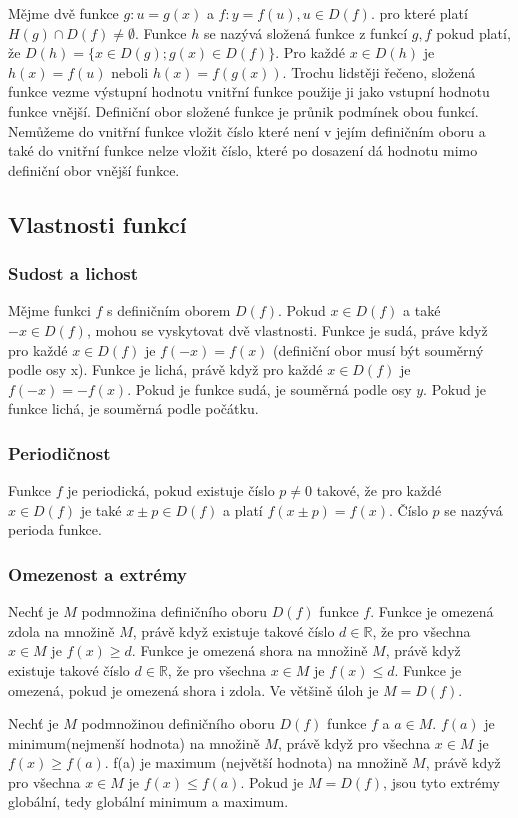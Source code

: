 \documentclass[12pt]{article}
\begin{document}
Mějme dvě funkce $g: u = g(x)$ a $f: y = f(u), u \in D(f)$. pro které platí $H(g) \cap D(f) \ne 
\emptyset$. Funkce $h$ se nazývá složená funkce z funkcí $g, f$ pokud platí, že $D(h) = \{x \in D(g);
g(x) \in D(f)\}$. Pro každé $x \in D(h)$ je $h(x) = f(u)$ neboli $h(x) = f(g(x))$. Trochu lidstěji 
řečeno, složená funkce vezme výstupní hodnotu vnitřní funkce použije ji jako vstupní hodnotu funkce
vnější. Definiční obor složené funkce je průnik podmínek obou funkcí. Nemůžeme do vnitřní funkce
vložit číslo které není v jejím definičním oboru a také do vnitřní funkce nelze vložit číslo, které po
dosazení dá hodnotu mimo definiční obor vnější funkce.
\subsection*{Vlastnosti funkcí}
\subsubsection*{Sudost a lichost}
Mějme funkci $f$ s definičním oborem $D(f)$. Pokud $x \in D(f)$ a také $-x \in D(f)$, mohou se
vyskytovat dvě vlastnosti. Funkce je sudá, práve když pro každé $x \in D(f)$ je $f(-x) = f(x)$ (definiční obor musí být souměrný podle osy x).
Funkce je lichá, právě když pro každé $x \in D(f)$ je $f(-x) = -f(x)$. Pokud je funkce sudá, je
souměrná podle osy $y$. Pokud je funkce lichá, je souměrná podle počátku.
\subsubsection*{Periodičnost}
Funkce $f$ je periodická, pokud existuje číslo $p \ne 0$ takové, že pro každé $x \in D(f)$ je také $x
\pm p \in D(f)$ a platí $f(x \pm p) = f(x)$. Číslo $p$ se nazývá perioda funkce.
\subsubsection*{Omezenost a extrémy}
Nechť je $M$ podmnožina definičního oboru $D(f)$ funkce $f$. Funkce je omezená zdola na množině $M$,
právě když existuje takové číslo $d \in \mathbb{R}$, že pro všechna $x \in M$ je $f(x) \ge d$.
Funkce je omezená shora na množině $M$, právě když existuje takové číslo $d \in \mathbb{R}$, že pro
všechna $x \in M$ je $f(x) \le d$. Funkce je omezená, pokud je omezená shora i zdola. Ve většině úloh
je $M = D(f)$.

Nechť je $M$ podmnožinou definičního oboru $D(f)$ funkce $f$ a $a \in M$. $f(a)$ je minimum(nejmenší
hodnota) na množině $M$, právě když pro všechna $x \in M$ je $f(x) \ge f(a)$. f(a) je maximum
(největší hodnota) na množině $M$, právě když pro všechna $x \in M$ je $f(x) \le f(a)$. Pokud je
$M = D(f)$, jsou tyto extrémy globální, tedy globální minimum a maximum.
\end{document}

